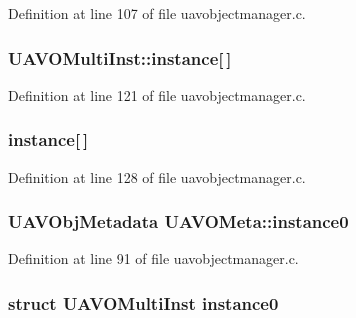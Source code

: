 Definition at line 107 of file uavobjectmanager.\-c.

\hypertarget{group___u_a_v_gab48732994d9762f9493940dc57e60f8b}{
\subsubsection[{instance}]{ U\-A\-V\-O\-Multi\-Inst\-::instance\mbox{[}$\,$\mbox{]}}}\label{group___u_a_v_gab48732994d9762f9493940dc57e60f8b}


Definition at line 121 of file uavobjectmanager.\-c.

\hypertarget{group___u_a_v_ga9eba2b5756444f64b374ac6725a8f120}{
\subsubsection[{instance}]{ instance\mbox{[}$\,$\mbox{]}}}\label{group___u_a_v_ga9eba2b5756444f64b374ac6725a8f120}


Definition at line 128 of file uavobjectmanager.\-c.

\hypertarget{group___u_a_v_gae6be2c703c11bc6bb66109a55dd84d9e}{
\subsubsection[{instance0}]{\setlength{\rightskip}{0pt plus 5cm}U\-A\-V\-Obj\-Metadata U\-A\-V\-O\-Meta\-::instance0}}\label{group___u_a_v_gae6be2c703c11bc6bb66109a55dd84d9e}


Definition at line 91 of file uavobjectmanager.\-c.

\hypertarget{group___u_a_v_ga7ae46078929ae4d2ce2e2d74a4d6bfa9}{
\subsubsection[{instance0}]{\setlength{\rightskip}{0pt plus 5cm}struct {\bf U\-A\-V\-O\-Multi\-Inst} instance0}}\label{group___u_a_v_ga7ae46078929ae4d2ce2e2d74a4d6bfa9}


